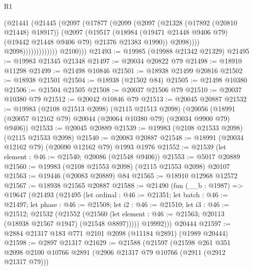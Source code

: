 \begin{lexlean}{R1}
\begin{coremodule}
                              (@21441
                                (@21445
                                  (@2097
                                    (@17877
                                      (@2099
                                        (@2097
                                          (@21328 (@17892 (@20810 @21448) @18917))
                                          (@2097
                                            (@19517
                                              (@18984
                                                (@19471 @21448 @9406 @79)
                                                (@19442 @21448 @9406 @79)
                                                @21376
                                                @21383
                                                @1990))
                                            @2098))))
                                    @2098)))))))))))))
          @2100)))
@21493 := @19985 (@19988 @21342 @21329)
@21495 := @19983 @21345 @21348
@21497 := @20034 @20822 @79
@21498 := @18910 @11298
@21499 := @21498 @10846
@21501 := @18938 @21499 @20816
@21502 := @18938 @21501
@21504 := @18938 (@21502 @84)
@21505 := @21498 @10380
@21506 := @21504 @21505
@21508 := @20037 @21506 @79
@21510 := @20037 @10380 @79
@21512 := @20042 @10846 @79
@21513 := @20045 @20887
@21532 := @19983
    (@2108 @21513 @2098)
    (@2115 @21513 @2098)
    (@20056 (@18991 (@20057 @12162 @79) @20044 (@20064 @10380 @79) (@20034 @9900 @79) @9406))
@21533 := @20045 @20889
@21539 := @19983 (@2108 @21533 @2098) (@2115 @21533 @2098)
@21540 := @20083 @20887
@21548 := @18991 (@20034 @12162 @79) (@20090 @12162 @79) @1993 @1976
@21552 := @21539 (let element : @46 := @21540; @20086 (@21548 @9406))
@21553 := @5017 @20889
@21560 := @19983 (@2108 @21553 @2098) (@2115 @21553 @2098) @20107
@21563 := @19446 (@20083 @20889) @84
@21565 := @18910 @12968 @12572
@21567 := @18938 @21565 @20887
@21588 := @21490
    (fun (__b : @1987) =>
    @19647
      (@21493
        (@21495
          (let ordinal : @46 := @21351;
          let batch : @46 := @21497;
          let phase : @46 := @21508;
          let i2 : @46 := @21510;
          let i3 : @46 := @21512;
          @21532
            (@21552
              (@21560 (let element : @46 := @21563; @20113 (@18938 @21567 @1947) (@21548 @8897)))))
          @19992)))
    @20444
@21597 := @2884 @21317 @183 @771 @2101 @2098 (@11184 @2891) (@1989 @20444)
@21598 := @2897 @21317
@21629 := @21588
    (@21597
      (@21598
        @261
        @351
        @2098
        @2100
        @10766
        @2891
        (@2906 @21317 @79 @10766 (@2911 (@2912 @21317 @79)))

\end{coremodule}
\end{lexlean}
